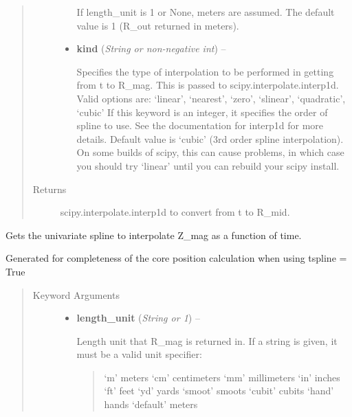 \documentclass[letterpaper,10pt,english]{sphinxmanual}
\begin{document}
\begin{fulllineitems}
\begin{fulllineitems}
\begin{quote}
\begin{description}
\begin{itemize}
If length\_unit is 1 or None, meters are assumed. The default
value is 1 (R\_out returned in meters).

\item {} 
\textbf{kind} (\emph{String or non-negative int}) --

Specifies the type of interpolation
to be performed in getting from t to R\_mag. This is
passed to scipy.interpolate.interp1d. Valid options are:
`linear', `nearest', `zero', `slinear', `quadratic', `cubic'
If this keyword is an integer, it specifies the order of spline
to use. See the documentation for interp1d for more details.
Default value is `cubic' (3rd order spline interpolation). On
some builds of scipy, this can cause problems, in which case
you should try `linear' until you can rebuild your scipy install.

\end{itemize}

\item[{Returns}] \leavevmode
scipy.interpolate.interp1d to convert from t to R\_mid.

\end{description}\end{quote}

\end{fulllineitems}


\begin{fulllineitems}
\label{eqtools:eqtools.core.Equilibrium.getMagZSpline}
Gets the univariate spline to interpolate Z\_mag as a function of time.

Generated for completeness of the core position calculation when using
tspline = True
\begin{quote}\begin{description}
\item[{Keyword Arguments}] \leavevmode\begin{itemize}
\item {} 
\textbf{length\_unit} (\emph{String or 1}) --

Length unit that R\_mag is returned in. If
a string is given, it must be a valid unit specifier:
\begin{quote}

`m'         meters
`cm'        centimeters
`mm'        millimeters
`in'        inches
`ft'        feet
`yd'        yards
`smoot'     smoots
`cubit'     cubits
`hand'      hands
`default'   meters
\end{quote}


\end{itemize}
\end{description}
\end{quote}
\end{fulllineitems}
\end{fulllineitems}
\end{document}

